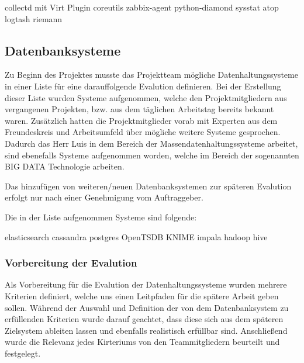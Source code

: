 \begin{outline}
  \1 collectd mit Virt Plugin
  \1 coreutils
  \1 zabbix-agent
  \1 python-diamond
  \1 sysstat
  \1 atop
  \1 logtash
  \1 riemann
\end{outline}

\subsection{Datenbanksysteme}
\label{subsec:datenbanksysteme}
Zu Beginn des Projektes musste das Projektteam mögliche Datenhaltungssysteme
in einer Liste für eine darauffolgende Evalution definieren. Bei der
Erstellung dieser Liste wurden Systeme aufgenommen, welche den 
Projektmitgliedern aus vergangenen Projekten, bzw. aus dem täglichen
Arbeitstag bereits bekannt waren. Zusätzlich hatten die Projektmitglieder vorab mit
Experten aus dem Freundeskreis und Arbeitsumfeld über mögliche
weitere Systeme gesprochen. Dadurch das Herr Luis in dem Bereich der
Massendatenhaltungssysteme arbeitet, sind ebenefalls Systeme aufgenommen
worden, welche im Bereich der sogenannten BIG DATA Technologie
arbeiten.

Das hinzufügen von weiteren/neuen Datenbanksystemen zur späteren
Evalution erfolgt nur nach einer Genehmigung vom Auftraggeber.

Die in der Liste aufgenommen Systeme sind folgende:
\begin{outline}
  \1 elasticsearch
  \1 cassandra
  \1 postgres
  \1 OpenTSDB
  \1 KNIME
  \1 impala
  \1 hadoop
  \1 hive
\end{outline}
\nl%

\subsubsection{Vorbereitung der Evalution}
\label{subsubsec:vorbereitung_der_evalution}
Als Vorbereitung für die Evalution der Datenhaltungssysteme wurden
mehrere Kriterien definiert, welche uns einen Leitpfaden für die 
spätere Arbeit geben sollen. Während der Auswahl und Definition 
der von dem Datenbanksystem zu erfüllenden Kriterien wurde darauf
geachtet, dass diese sich aus dem späteren Zielsystem ableiten lassen
und ebenfalls realistisch erfüllbar sind. Anschließend wurde die
Relevanz jedes Kirteriums von den Teammitgliedern beurteilt und
festgelegt. 

